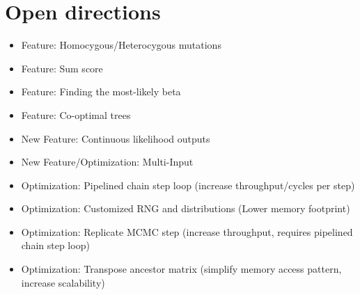 \section{Open directions}


\begin{itemize}
    \item Feature: Homocygous/Heterocygous mutations
    \item Feature: Sum score
    \item Feature: Finding the most-likely beta
    \item Feature: Co-optimal trees
    \item New Feature: Continuous likelihood outputs
    \item New Feature/Optimization: Multi-Input
    \item Optimization: Pipelined chain step loop (increase throughput/cycles per step)
    \item Optimization: Customized RNG and distributions (Lower memory footprint)
    \item Optimization: Replicate MCMC step (increase throughput, requires pipelined chain step loop)
    \item Optimization: Transpose ancestor matrix (simplify memory access pattern, increase scalability)
\end{itemize}